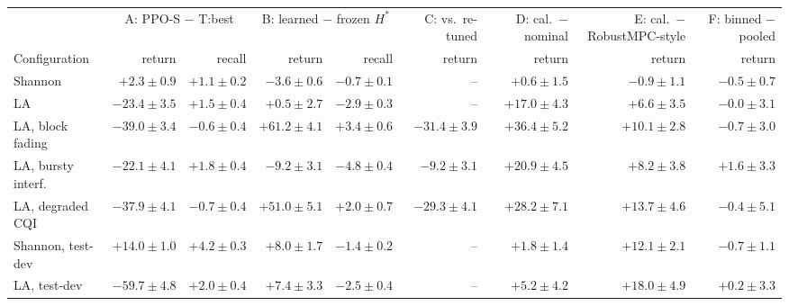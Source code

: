 \begin{tabular}{@{}lrrrrrrrr@{}}
\toprule
 & \multicolumn{2}{c}{A: PPO-S $-$ T:best} & \multicolumn{2}{c}{B: learned $-$ frozen $H^*$} & C: vs.\ re-tuned & D: cal.\ $-$ nominal & E: cal.\ $-$ RobustMPC-style & F: binned $-$ pooled\\
\cmidrule(lr){2-3}\cmidrule(lr){4-5}
Configuration & return & recall & return & recall & return & return & return & return\\
\midrule
Shannon & $\mathbf{+2.3}\pm0.9$ & $\mathbf{+1.1}\pm0.2$ & $\mathbf{-3.6}\pm0.6$ & $\mathbf{-0.7}\pm0.1$ & -- & $+0.6\pm1.5$ & $-0.9\pm1.1$ & $-0.5\pm0.7$ \\
LA & $\mathbf{-23.4}\pm3.5$ & $\mathbf{+1.5}\pm0.4$ & $+0.5\pm2.7$ & $\mathbf{-2.9}\pm0.3$ & -- & $\mathbf{+17.0}\pm4.3$ & $\mathbf{+6.6}\pm3.5$ & $-0.0\pm3.1$ \\
LA, block fading & $\mathbf{-39.0}\pm3.4$ & $\mathbf{-0.6}\pm0.4$ & $\mathbf{+61.2}\pm4.1$ & $\mathbf{+3.4}\pm0.6$ & $\mathbf{-31.4}\pm3.9$ & $\mathbf{+36.4}\pm5.2$ & $\mathbf{+10.1}\pm2.8$ & $-0.7\pm3.0$ \\
LA, bursty interf. & $\mathbf{-22.1}\pm4.1$ & $\mathbf{+1.8}\pm0.4$ & $\mathbf{-9.2}\pm3.1$ & $\mathbf{-4.8}\pm0.4$ & $\mathbf{-9.2}\pm3.1$ & $\mathbf{+20.9}\pm4.5$ & $\mathbf{+8.2}\pm3.8$ & $+1.6\pm3.3$ \\
LA, degraded CQI & $\mathbf{-37.9}\pm4.1$ & $\mathbf{-0.7}\pm0.4$ & $\mathbf{+51.0}\pm5.1$ & $\mathbf{+2.0}\pm0.7$ & $\mathbf{-29.3}\pm4.1$ & $\mathbf{+28.2}\pm7.1$ & $\mathbf{+13.7}\pm4.6$ & $-0.4\pm5.1$ \\
Shannon, test-dev & $\mathbf{+14.0}\pm1.0$ & $\mathbf{+4.2}\pm0.3$ & $\mathbf{+8.0}\pm1.7$ & $\mathbf{-1.4}\pm0.2$ & -- & $\mathbf{+1.8}\pm1.4$ & $\mathbf{+12.1}\pm2.1$ & $-0.7\pm1.1$ \\
LA, test-dev & $\mathbf{-59.7}\pm4.8$ & $\mathbf{+2.0}\pm0.4$ & $\mathbf{+7.4}\pm3.3$ & $\mathbf{-2.5}\pm0.4$ & -- & $\mathbf{+5.2}\pm4.2$ & $\mathbf{+18.0}\pm4.9$ & $+0.2\pm3.3$ \\
\bottomrule
\end{tabular}
